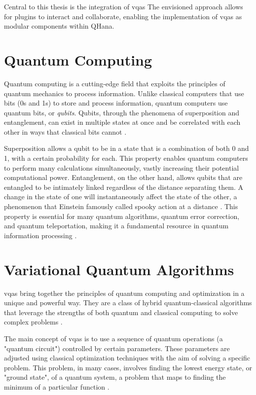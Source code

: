 \documentclass[
  a4paper,  %
  twoside,  %
  bibliography=totoc,
  headsepline,
  cleardoublepage=empty,
  parskip=half,
  draft=false
]{scrbook}
\begin{document}
Central to this thesis is the integration of \glspl{vqa}
The envisioned approach allows for plugins to interact and collaborate, enabling the implementation of \glspl{vqa} as modular components within QHana.

\section{Quantum Computing}
\label{sec:quantumComputing}
Quantum computing is a cutting-edge field that exploits the principles of quantum mechanics to process information.
Unlike classical computers that use bits (0s and 1s) to store and process information, quantum computers use quantum bits, or \emph{qubits}.
Qubits, through the phenomena of superposition and entanglement, can exist in multiple states at once and be correlated with each other in ways that classical bits cannot \cite{Nielsen2010}.

Superposition allows a qubit to be in a state that is a combination of both 0 and 1, with a certain probability for each.
This property enables quantum computers to perform many calculations simultaneously, vastly increasing their potential computational power.
Entanglement, on the other hand, allows qubits that are entangled to be intimately linked regardless of the distance separating them.
A change in the state of one will instantaneously affect the state of the other, a phenomenon that Einstein famously called spooky action at a distance \cite{Einstein1935}.
This property is essential for many quantum algorithms, quantum error correction, and quantum teleportation, making it a fundamental resource in quantum information processing \cite{Nielsen2010,Preskill1998}.


\section{Variational Quantum Algorithms}
\label{sec:variationalQuantumAlgorithms}

\glspl{vqa} bring together the principles of quantum computing and optimization in a unique and powerful way.
They are a class of hybrid quantum-classical algorithms that leverage the strengths of both quantum and classical computing to solve complex problems \cite{McClean2016}.

The main concept of \glspl{vqa} is to use a sequence of quantum operations (a "quantum circuit") controlled by certain parameters.
These parameters are adjusted using classical optimization techniques with the aim of solving a specific problem.
This problem, in many cases, involves finding the lowest energy state, or "ground state", of a quantum system, a problem that maps to finding the minimum of a particular function \cite{Peruzzo2013}.
\end{document}
